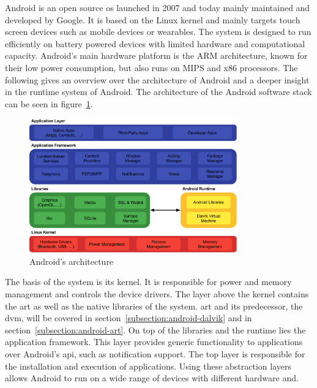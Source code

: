 Android is an open source \gls{os} launched in 2007 and today mainly maintained and developed by Google.
It is based on the Linux kernel and mainly targets touch screen devices such as mobile devices or wearables.
The system is designed to run efficiently on battery powered devices with limited hardware and computational capacity.
Android's main hardware platform is the ARM architecture, known for their low power consumption, but also runs on MIPS and x86 processors.
The following gives an overview over the architecture of Android and a deeper insight in the runtime system of Android.
The architecture of the Android software stack can be seen in figure~\ref{fig:androidArchitecture}.
\newline
\begin{figure}[h]
    \centering
    \includegraphics[width=0.8\textwidth]{data/stack.png}
    \caption{Android's architecture \cite{androidStack}}
    \label{fig:androidArchitecture}
\end{figure}
The basis of the system is its kernel.
It is responsible for power and memory management and controls the device drivers.
\newline
The layer above the kernel contains the \gls{art} as well as the native libraries of the system.
\gls{art} and its predecessor, the \gls{dvm}, will be covered in section~\ref{subsection:android-dalvik} and in section~\ref{subsection:android-art}.
\newline
On top of the libraries and the runtime lies the application framework.
This layer provides generic functionality to applications over Android's \gls{api}, such as notification support.
\newline
The top layer is responsible for the installation and execution of applications.
\newline
Using these abstraction layers allows Android to run on a wide range of devices with different hardware and.
